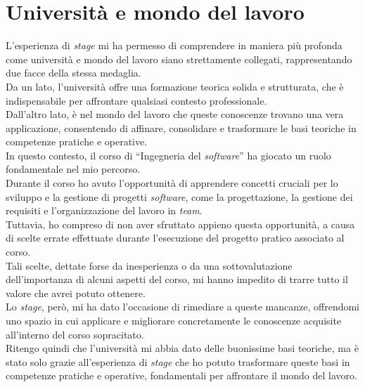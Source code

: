 \section{Università e mondo del lavoro}
\label{sez:universita-mondo-lavoro}

L’esperienza di \textit{stage} mi ha permesso di comprendere in maniera più profonda come università e mondo del lavoro siano strettamente collegati, rappresentando due facce della stessa medaglia.\\
Da un lato, l’università offre una formazione teorica solida e strutturata, che è indispensabile per affrontare qualsiasi contesto professionale. \\
Dall’altro lato, è nel mondo del lavoro che queste conoscenze trovano una vera applicazione, consentendo di affinare, consolidare e trasformare le basi teoriche in competenze pratiche e operative.  \\

\noindent In questo contesto, il corso di ``Ingegneria del \textit{software}'' ha giocato un ruolo fondamentale nel mio percorso.\\
Durante il corso ho avuto l’opportunità di apprendere concetti cruciali per lo sviluppo e la gestione di progetti \textit{software}, come la progettazione, la gestione dei requisiti e l’organizzazione del lavoro in \textit{team}. \\
Tuttavia, ho compreso di non aver sfruttato appieno questa opportunità, a causa di scelte errate effettuate durante l’esecuzione del progetto pratico associato al corso.\\
Tali scelte, dettate forse da inesperienza o da una sottovalutazione dell’importanza di alcuni aspetti del corso, mi hanno impedito di trarre tutto il valore che avrei potuto ottenere. \\ 

\noindent Lo \textit{stage}, però, mi ha dato l’occasione di rimediare a queste mancanze, offrendomi uno spazio in cui applicare e migliorare concretamente le conoscenze acquisite all'interno del corso sopracitato.\\
Ritengo quindi che l'università mi abbia dato delle buonissime basi teoriche, ma è stato solo grazie all'esperienza di \textit{stage} che ho potuto trasformare queste basi in competenze pratiche e operative, fondamentali per affrontare il mondo del lavoro.\\